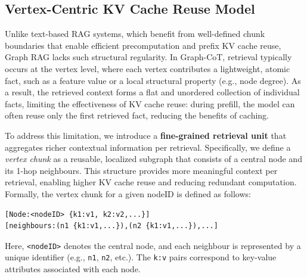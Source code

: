 \subsection{Vertex-Centric KV Cache Reuse Model} \label{sec:vertex_centric_kv}



Unlike text-based RAG systems, which benefit from well-defined chunk boundaries that enable efficient precomputation and prefix KV cache reuse, Graph RAG lacks such structural regularity. In Graph-CoT, retrieval typically occurs at the vertex level, where each vertex contributes a lightweight, atomic fact, such as a feature value or a local structural property (e.g., node degree). As a result, the retrieved context forms a flat and unordered collection of individual facts, limiting the effectiveness of KV cache reuse: during prefill, the model can often reuse only the first retrieved fact, reducing the benefits of caching.  

To address this limitation, we introduce a \textbf{fine-grained retrieval unit} that aggregates richer contextual information per retrieval. Specifically, we define a \emph{vertex chunk} as a reusable, localized subgraph that consists of a central node and its 1-hop neighbours. This structure provides more meaningful context per retrieval, enabling higher KV cache reuse and reducing redundant computation. Formally, the vertex chunk for a given nodeID is defined as follows:

\vspace{-0.5\baselineskip}
\begin{verbatim}
[Node:<nodeID> {k1:v1, k2:v2,...}]
[neighbours:(n1 {k1:v1,...}),(n2 {k1:v1,...}),...]
\end{verbatim}
\vspace{-0.5\baselineskip}

Here, \texttt{<nodeID>} denotes the central node, and each neighbour is represented by a unique identifier (e.g., \texttt{n1}, \texttt{n2}, etc.). The \texttt{k:v} pairs correspond to key-value attributes associated with each node.  

